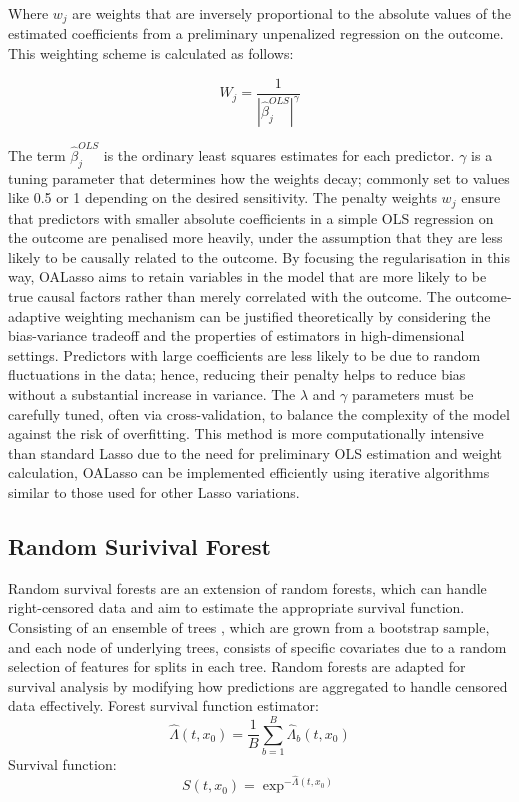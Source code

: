 \noindent Where \(w_{j}\) are weights that are inversely proportional to the absolute values of the estimated coefficients from a preliminary unpenalized regression on the outcome. This weighting scheme is calculated as follows:

\begin{equation} \label{eq:oalssobound}W_{j} = \frac{1}{|\hat{\beta}_{j}^{OLS}|^{\gamma}}\end{equation}

\noindent The term \(\hat{\beta}_{j}^{OLS}\) is the ordinary least squares estimates for each predictor. \(\gamma\) is a tuning parameter that determines how the weights decay; commonly set to values like 0.5 or 1 depending on the desired sensitivity. The penalty weights \(w_{j}\) ensure that predictors with smaller absolute coefficients in a simple OLS regression on the outcome are penalised more heavily, under the assumption that they are less likely to be causally related to the outcome. By focusing the regularisation in this way, \parencite{shortreed_outcome-adaptive_2017} OALasso aims to retain variables in the model that are more likely to be true causal factors rather than merely correlated with the outcome. The outcome-adaptive weighting mechanism can be justified theoretically by considering the bias-variance tradeoff and the properties of estimators in high-dimensional settings. Predictors with large coefficients are less likely to be due to random fluctuations in the data; hence, reducing their penalty helps to reduce bias without a substantial increase in variance. The \(\lambda\) and \(\gamma\) parameters must be carefully tuned, often via cross-validation, to balance the complexity of the model against the risk of overfitting. This method is more computationally intensive than standard Lasso due to the need for preliminary OLS estimation and weight calculation, OALasso can be implemented efficiently using iterative algorithms \parencite{shortreed_outcome-adaptive_2017} similar to those used for other Lasso variations.


\subsection{Random Surivival Forest}
\noindent Random survival forests \parencite{ishwaran_random_2008} are an extension of random forests, which can handle right-censored data and aim to estimate the appropriate survival function. Consisting of an ensemble of trees \parencite{ishwaran_random_2008}, which are grown from a bootstrap sample, and each node of underlying trees, consists of specific covariates due to a random selection of features for splits in each tree. Random forests are adapted for survival analysis by modifying how predictions are aggregated to handle censored data effectively. Forest survival function estimator:
\begin{equation} \label{eq:rsfestimator}\hat{\Lambda}(t, x_{0}) = \frac{1}{B} \sum_{b=1}^{B} \hat{\Lambda}_{b}(t,x_{0})\end{equation}
Survival function:
\begin{equation} \label{eq:survrsf}S(t,x_{0}) = \exp^{-\hat{\Lambda}(t,x_{0})}\end{equation}

